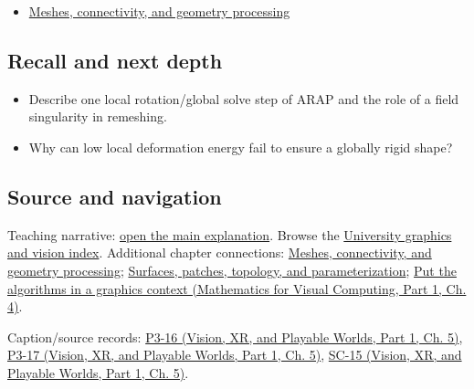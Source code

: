\hypertarget{appendix-7107009c505b-full-teaching-explanation}{}

\begin{itemize}
\tightlist
\item
  \hyperref[03-visual-computing-i-ch002-meshes-connectivity-and-geometry-processing]{Meshes, connectivity, and geometry processing}
\end{itemize}

\subsection{Recall and next depth}\label{appendix-7107009c505b-recall-and-next-depth}

\hypertarget{appendix-7107009c505b-recall-and-next-depth}{}

\begin{itemize}
\tightlist
\item
  Describe one local rotation/global solve step of ARAP and the role of a field singularity in remeshing.
\item
  Why can low local deformation energy fail to ensure a globally rigid shape?
\end{itemize}

\subsection{Source and navigation}\label{appendix-7107009c505b-source-and-navigation}

\hypertarget{appendix-7107009c505b-source-and-navigation}{}

Teaching narrative: \hyperref[03-visual-computing-i-ch002-meshes-connectivity-and-geometry-processing]{open the main explanation}. Browse the \hyperref[appendix-a6d556a4ef50-university-graphics-vision-and-photography---independent-series]{University graphics and vision index}. Additional chapter connections: \hyperref[03-visual-computing-i-ch002-meshes-connectivity-and-geometry-processing]{Meshes, connectivity, and geometry processing}; \hyperref[03-visual-computing-i-ch002-surfaces-patches-topology-and-parameterization]{Surfaces, patches, topology, and parameterization}; \href{../02-Mathematics-for-Visual-Computing-P01/main.pdf\#nameddest=01-foundations-i-ch020-put-the-algorithms-in-a-graphics-context}{Put the algorithms in a graphics context (Mathematics for Visual Computing, Part 1, Ch. 4)}.

Caption/source records: \href{../07-Vision-XR-and-Playable-Worlds-P01/main.pdf\#nameddest=04-visual-computing-ii-ch036-p3-16---subdivision-surfaces-part-1}{P3-16 (Vision, XR, and Playable Worlds, Part 1, Ch. 5)}, \href{../07-Vision-XR-and-Playable-Worlds-P01/main.pdf\#nameddest=04-visual-computing-ii-ch036-p3-17---subdivision-surfaces-part-2}{P3-17 (Vision, XR, and Playable Worlds, Part 1, Ch. 5)}, \href{../07-Vision-XR-and-Playable-Worlds-P01/main.pdf\#nameddest=04-visual-computing-ii-ch036-sc-15---stanford-cs231n-deep-learning-for-computer-vision-spring-2025-lecture-15-3d-vision}{SC-15 (Vision, XR, and Playable Worlds, Part 1, Ch. 5)}.
